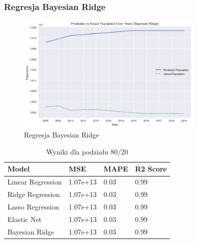 \documentclass[11pt]{article}
\begin{document}
\subsubsection*{Regresja Bayesian Ridge}
\begin{figure}[H]
        \centering
        \includegraphics[width=0.8\textwidth]{images/bayesian_ridge.png}
        \caption{Regresja Bayesian Ridge}
\end{figure}
\begin{table}[H]
        \centering
        \begin{tabular}{|l|l|l|l|}
        \hline
        Model & MSE & MAPE & R2 Score \\ \hline
        Linear Regression & 1.07e+13 & 0.03 & 0.99 \\ \hline
        Ridge Regression & 1.07e+13 & 0.03 & 0.99 \\ \hline
        Lasso Regression & 1.07e+13 & 0.03 & 0.99 \\ \hline
        Elastic Net & 1.07e+13 & 0.03 & 0.99 \\ \hline
        Bayesian Ridge & 1.07e+13 & 0.03 & 0.99 \\ \hline
        \end{tabular}
        \caption{Wyniki dla podziału 80/20}
        \end{table}


\end{document}
